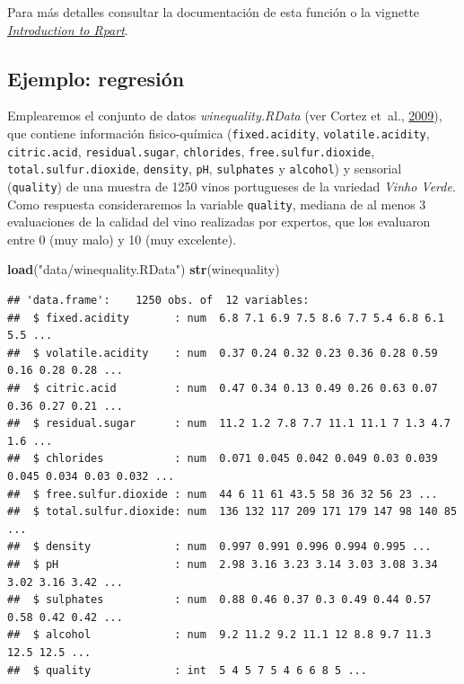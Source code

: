 \documentclass[
  spanish,
]{book}
\newenvironment{Shaded}{\begin{snugshade}}{\end{snugshade}}
\newcommand{\KeywordTok}[1]{\textcolor[rgb]{0.13,0.29,0.53}{\textbf{#1}}}
\newcommand{\NormalTok}[1]{#1}
\newcommand{\StringTok}[1]{\textcolor[rgb]{0.31,0.60,0.02}{#1}}
\theoremstyle{break}
\theoremstyle{definition}
\theoremstyle{definition}
\theoremstyle{definition}
\theoremstyle{remark}
\begin{document}
Para más detalles consultar la documentación de esta función o la vignette \href{https://cran.r-project.org/web/packages/rpart/vignettes/longintro.pdf}{\emph{Introduction to Rpart}}.

\hypertarget{ejemplo-regresiuxf3n}{%
\subsection{Ejemplo: regresión}\label{ejemplo-regresiuxf3n}}

Emplearemos el conjunto de datos \emph{winequality.RData} (ver Cortez et~al., \protect\hyperlink{ref-cortez2009modeling}{2009}), que contiene información fisico-química
(\texttt{fixed.acidity}, \texttt{volatile.acidity}, \texttt{citric.acid}, \texttt{residual.sugar}, \texttt{chlorides}, \texttt{free.sulfur.dioxide},
\texttt{total.sulfur.dioxide}, \texttt{density}, \texttt{pH}, \texttt{sulphates} y \texttt{alcohol}) y sensorial (\texttt{quality})
de una muestra de 1250 vinos portugueses de la variedad \emph{Vinho Verde}.
Como respuesta consideraremos la variable \texttt{quality}, mediana de al menos 3 evaluaciones de la calidad del vino
realizadas por expertos, que los evaluaron entre 0 (muy malo) y 10 (muy excelente).

\begin{Shaded}
\begin{Highlighting}[]
\KeywordTok{load}\NormalTok{(}\StringTok{"data/winequality.RData"}\NormalTok{)}
\KeywordTok{str}\NormalTok{(winequality)}
\end{Highlighting}
\end{Shaded}

\begin{verbatim}
## 'data.frame':    1250 obs. of  12 variables:
##  $ fixed.acidity       : num  6.8 7.1 6.9 7.5 8.6 7.7 5.4 6.8 6.1 5.5 ...
##  $ volatile.acidity    : num  0.37 0.24 0.32 0.23 0.36 0.28 0.59 0.16 0.28 0.28 ...
##  $ citric.acid         : num  0.47 0.34 0.13 0.49 0.26 0.63 0.07 0.36 0.27 0.21 ...
##  $ residual.sugar      : num  11.2 1.2 7.8 7.7 11.1 11.1 7 1.3 4.7 1.6 ...
##  $ chlorides           : num  0.071 0.045 0.042 0.049 0.03 0.039 0.045 0.034 0.03 0.032 ...
##  $ free.sulfur.dioxide : num  44 6 11 61 43.5 58 36 32 56 23 ...
##  $ total.sulfur.dioxide: num  136 132 117 209 171 179 147 98 140 85 ...
##  $ density             : num  0.997 0.991 0.996 0.994 0.995 ...
##  $ pH                  : num  2.98 3.16 3.23 3.14 3.03 3.08 3.34 3.02 3.16 3.42 ...
##  $ sulphates           : num  0.88 0.46 0.37 0.3 0.49 0.44 0.57 0.58 0.42 0.42 ...
##  $ alcohol             : num  9.2 11.2 9.2 11.1 12 8.8 9.7 11.3 12.5 12.5 ...
##  $ quality             : int  5 4 5 7 5 4 6 6 8 5 ...
\end{verbatim}
\end{document}
